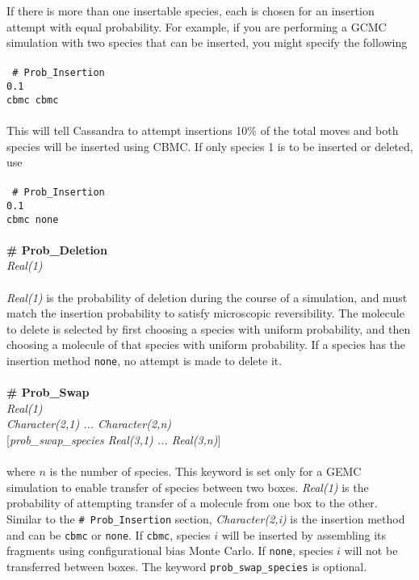 If there is more than one insertable species, each is chosen for an insertion attempt with equal probability. 
For example, if you are performing a GCMC simulation with two species that can 
be inserted, you might specify the following \\ \\ 
%
\texttt{
\# Prob\_Insertion \\
0.1 \\
cbmc cbmc} \\ \\ 
%
This will tell Cassandra to attempt insertions 10\% of the total moves and
both species will be inserted using CBMC.
If only species 1 is to be inserted or deleted, use \\ \\
%
\texttt{
\# Prob\_Insertion \\
0.1 \\
cbmc none} \\ \\ 
%
%
%
{\bf \# Prob\_Deletion} \\
{\it Real(1)} \\ \\
%
{\it Real(1)} is the probability of deletion during the course of a simulation, 
and must match the insertion probability to satisfy microscopic reversibility.
The molecule to delete is selected by first choosing a species with uniform probability, 
and then choosing a molecule of that species with uniform probability.
If a species has the insertion method \texttt{none}, no attempt is made to delete it. \\ \\
%
%
%
{\bf \# Prob\_Swap}\\
{\it Real(1)} \\ 
{\it Character(2,1) ... Character(2,n)} \\
{[}{\it prob\_swap\_species Real(3,1) ... Real(3,n)}] \\ \\
%
where $n$ is the number of species.
This keyword is set only for a GEMC simulation to enable transfer of species between two boxes.
{\em Real(1)} is the probability of attempting transfer of a molecule from one box to the other. 
Similar to the \texttt{\# Prob\_Insertion} section, 
{\em Character(2,i)} is the insertion method and can be \texttt{cbmc} or \texttt{none}. 
If \texttt{cbmc}, species $i$ will be inserted by assembling its 
fragments using configurational bias Monte Carlo.
If \texttt{none}, species $i$ will not be transferred between boxes.
The keyword \texttt{prob\_swap\_species} is optional.

